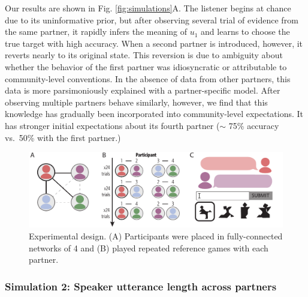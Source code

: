 \documentclass[10pt, letterpaper]{article}
\newenvironment{CodeChunk}{}{}
\begin{document}
Our results are shown in Fig. \ref{fig:simulations}A. The listener
begins at chance due to its uninformative prior, but after observing
several trial of evidence from the same partner, it rapidly infers the
meaning of \(u_1\) and learns to choose the true target with high
accuracy. When a second partner is introduced, however, it reverts
nearly to its original state. This reversion is due to ambiguity about
whether the behavior of the first partner was idiosyncratic or
attributable to community-level conventions. In the absence of data from
other partners, this data is more parsimoniously explained with a
partner-specific model. After observing multiple partners behave
similarly, however, we find that this knowledge has gradually been
incorporated into community-level expectations. It has stronger initial
expectations about its fourth partner (\(\sim\) 75\% accuracy vs.~50\%
with the first partner.)

\begin{CodeChunk}
\begin{figure}[t!]

{\centering \includegraphics{figs/design} 

}

\caption{\label{fig:task1_display} Experimental design. (A) Participants were placed in fully-connected networks of 4 and (B) played repeated reference games with each partner.}\label{fig:task_display}
\end{figure}
\end{CodeChunk}

\hypertarget{simulation-2-speaker-utterance-length-across-partners}{%
\subsubsection{Simulation 2: Speaker utterance length across
partners}\label{simulation-2-speaker-utterance-length-across-partners}}
\end{document}
